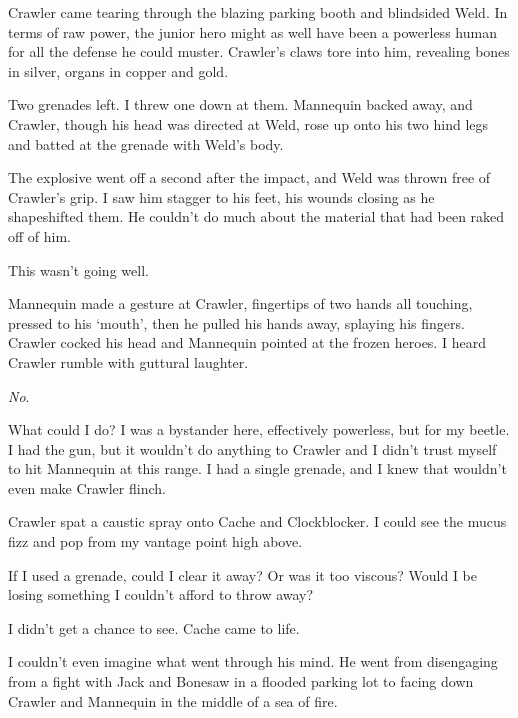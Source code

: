 Crawler came tearing through the blazing parking booth and blindsided Weld.  In terms of raw power, the junior hero might as well have been a powerless human for all the defense he could muster.  Crawler's claws tore into him, revealing bones in silver, organs in copper and gold.



Two grenades left.  I threw one down at them.  Mannequin backed away, and Crawler, though his head was directed at Weld, rose up onto his two hind legs and batted at the grenade with Weld's body.



The explosive went off a second after the impact, and Weld was thrown free of Crawler's grip.  I saw him stagger to his feet, his wounds closing as he shapeshifted them.  He couldn't do much about the material that had been raked off of him.



This wasn't going well.



Mannequin made a gesture at Crawler, fingertips of two hands all touching, pressed to his `mouth', then he pulled his hands away, splaying his fingers.  Crawler cocked his head and Mannequin pointed at the frozen heroes.  I heard Crawler rumble with guttural laughter.



\emph{No}.



What could I do?  I was a bystander here, effectively powerless, but for my beetle.  I had the gun, but it wouldn't do anything to Crawler and I didn't trust myself to hit Mannequin at this range.  I had a single grenade, and I knew that wouldn't even make Crawler flinch.



Crawler spat a caustic spray onto Cache and Clockblocker.  I could see the mucus fizz and pop from my vantage point high above.



If I used a grenade, could I clear it away?  Or was it too viscous?  Would I be losing something I couldn't afford to throw away?



I didn't get a chance to see.  Cache came to life.



I couldn't even imagine what went through his mind.  He went from disengaging from a fight with Jack and Bonesaw in a flooded parking lot to facing down Crawler and Mannequin in the middle of a sea of fire.



